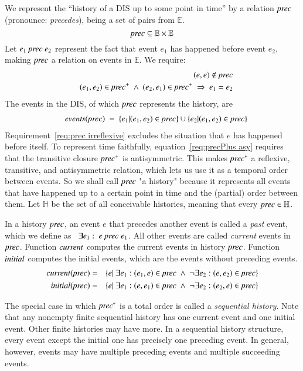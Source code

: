 \documentclass{elsarticle}
\def\id#1{\text{\em #1\/}}
\begin{document}
	We represent the ``history of a DIS up to some point in time'' by a relation $\id{prec}$ (pronounce: {\em precedes}),
	being a set of pairs from $\mathbb E$.
\[\id{prec}\subseteq\mathbb E\times\mathbb E\]
	Let $e_1\ \id{prec}\ e_2$ represent the fact that event $e_1$ has happened before event $e_2$,
	making $\id{prec}$ a relation on events in $\mathbb E$.
	We require:
\begin{eqnarray}
	&&(e,e)\notin\id{prec}\label{req:prec irreflexive}\\
	&&(e_1,e_2)\in\id{prec}^+\ \wedge\ (e_2,e_1)\in\id{prec}^+\ \Rightarrow\ e_1=e_2\label{req:precPlus asy}
\end{eqnarray}
	The events in the DIS, of which $\id{prec}$ represents the history, are 
\begin{eqnarray}
	&&\id{events}(\id{prec})\ =\ \{e_1|(e_1,e_2)\in\id{prec}\}\cup\{e_2|(e_1,e_2)\in\id{prec}\}\label{req:events}
\end{eqnarray}
	Requirement~\ref{req:prec irreflexive} excludes the situation that $e$ has happened before itself.
	To represent time faithfully, equation~\ref{req:precPlus asy} requires that the transitive closure $\id{prec}^+$ is antisymmetric.
	This makes $\id{prec}^*$ a reflexive, transitive, and antisymmetric relation, which lets us use it as a temporal order between events.
	So we shall call $\id{prec}$ "a history" because it represents all events that have happened up to a certain point in time and the (partial) order between them.
	Let $\mathbb H$ be the set of all conceivable histories, meaning that every $\id{prec}\in\mathbb H$.

	In a history $\id{prec}$, an event $e$ that precedes another event is called a {\em past} event,
	which we define as \ $\exists e_1:\ e\ \id{prec}\ e_1$.
	All other events are called {\em current} events in $\id{prec}$.
	Function $\id{current}$ computes the current events in history $\id{prec}$.
	Function $\id{initial}$ computes the initial events, which are the events without preceding events.
\begin{eqnarray}
	\id{current}(\id{prec})&=&\{e |\ \exists e_1: (e_1,e)\in\id{prec}\ \wedge\ \neg\exists e_2: (e,e_2)\in\id{prec}\}\\
	\id{initial}(\id{prec})&=&\{e |\ \exists e_1: (e,e_1)\in\id{prec}\ \wedge\ \neg\exists e_2: (e_2,e)\in\id{prec}\}
\end{eqnarray}

	The special case in which $\id{prec}^*$ is a total order is called a {\em sequential history}.
	Note that any nonempty finite sequential history has one current event and one initial event.
	Other finite histories may have more.
	In a sequential history structure, every event except the initial one has precisely one preceding event.
	In general, however, events may have multiple preceding events and multiple succeeding events.
\end{document}

